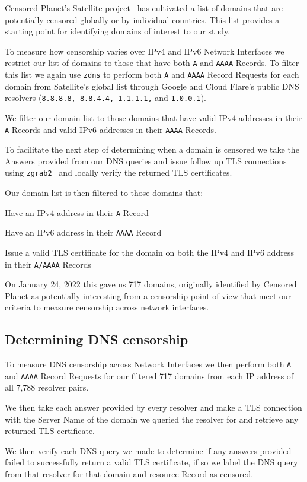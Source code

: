 Censored Planet's Satellite project~\cite{sundara2020censored} has cultivated a
list of domains that are potentially censored globally or by individual
countries. This list provides a starting point for identifying domains of
interest to our study.

To measure how censorship varies over IPv4 and IPv6 Network Interfaces we
restrict our list of domains to those that have both \texttt{A} and
\texttt{AAAA} Records. To filter this list we again use \texttt{zdns} to perform
both \texttt{A} and \texttt{AAAA} Record Requests for each domain from
Satellite's global list through Google and Cloud Flare's public DNS resolvers
(\texttt{8.8.8.8, 8.8.4.4, 1.1.1.1,} and \texttt{1.0.0.1}).

We filter our domain list to those domains that have valid IPv4 addresses in
their \texttt{A} Records and valid IPv6 addresses in their \texttt{AAAA}
Records.

To facilitate the next step of determining when a domain is censored we take the
Answers provided from our DNS queries and issue follow up TLS connections using
\texttt{zgrab2}~\cite{Durumeric13zmap} and locally verify the returned TLS
certificates.

Our domain list is then filtered to those domains that:
\begin{packed_enumerate}
    \item Have an IPv4 address in their \texttt{A} Record
    \item Have an IPv6 address in their \texttt{AAAA} Record
    \item Issue a valid TLS certificate for the domain on both the IPv4 and IPv6
    address in their \texttt{A/AAAA} Records
\end{packed_enumerate}

On January 24, 2022 this gave us 717 domains, originally identified by Censored
Planet as potentially interesting from a censorship point of view that meet our
criteria to measure censorship across network interfaces.

\subsection{Determining DNS censorship}\label{ssec:determining-censorship}

To measure DNS censorship across Network Interfaces we then perform both
\texttt{A} and \texttt{AAAA} Record Requests for our filtered 717 domains from
each IP address of all 7,788 resolver pairs.

We then take each answer provided by every resolver and make a TLS connection
with the Server Name of the domain we queried the resolver for and retrieve any
returned TLS certificate.

We then verify each DNS query we made to determine if any answers provided
failed to successfully return a valid TLS certificate, if so we label the DNS
query from that resolver for that domain and resource Record as censored.
